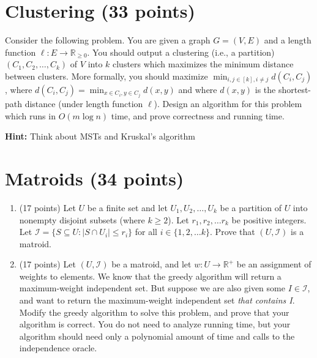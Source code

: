 \documentclass[11pt]{article}
\begin{document}
\section{Clustering (33 points)}
Consider the following problem. You are given a graph $G = (V, E)$ and a length function $\ell : E \rightarrow \mathbb{R}_{\geq 0}$.  You should output a clustering (i.e., a partition) $(C_1, C_2, \dots, C_k)$ of $V$ into $k$ clusters which maximizes the minimum distance between clusters.  More formally, you should maximize $\min_{i,j \in [k], i \neq j} d(C_i, C_j)$, where $d(C_i, C_j) = \min_{x \in C_i, y \in C_j} d(x,y)$ and where $d(x,y)$ is the shortest-path distance (under length function $\ell$).  Design an algorithm for this problem which runs in $O(m \log n)$ time, and prove correctness and running time.  

\textbf{Hint:} Think about MSTs and Kruskal's algorithm



\section{Matroids (34 points)}

\begin{enumerate}
\item (17 points) Let $U$ be a finite set and let $U_1, U_2, \dots, U_k$ be a partition of $U$ into nonempty disjoint subsets (where $k \geq 2$).  Let $r_1, r_2, \dots r_k$ be positive integers.  Let $\mathcal I = \{ S \subseteq U : |S \cap U_i| \leq r_i\}$ for all $i \in \{1,2,\dots k\}$.  Prove that $(U, \mathcal I)$ is a matroid.  


\item (17 points) Let $(U, \mathcal I)$ be a matroid, and let $w : U \rightarrow \mathbb{R}^+$ be an assignment of weights to elements.  We know that the greedy algorithm will return a maximum-weight independent set.  But suppose we are also given some $I \in \mathcal I$, and want to return the maximum-weight independent set \emph{that contains I}.  Modify the greedy algorithm to solve this problem, and prove that your algorithm is correct. You do not need to analyze running time, but your algorithm should need only a polynomial amount of time and calls to the independence oracle.


\end{enumerate}
\end{document}
